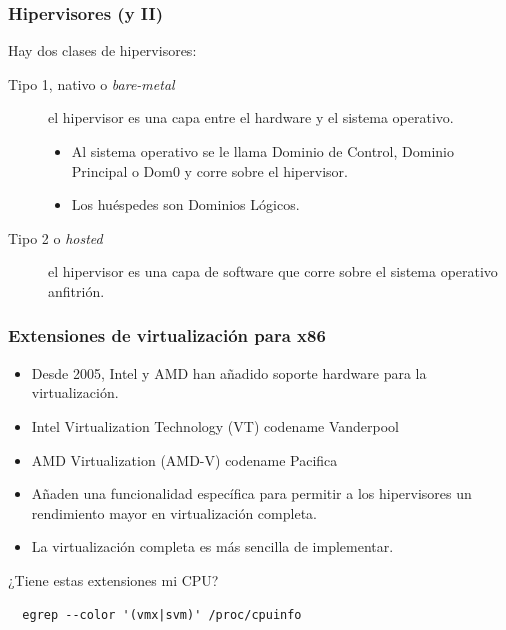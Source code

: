\documentclass{beamer}
\begin{document}
\begin{frame}
  \frametitle{Hipervisores (y II)}
  Hay dos clases de hipervisores:
  \begin{description}
  \item [Tipo 1, nativo o \emph{bare-metal}] el hipervisor es una capa
    entre el hardware y el sistema operativo.
    \begin{itemize}
    \item Al sistema operativo se le llama Dominio de Control, Dominio
      Principal o Dom0 y corre sobre el hipervisor.
    \item Los huéspedes son Dominios Lógicos.
    \end{itemize}
    \item [Tipo 2 o \emph{hosted}] el hipervisor es una capa de
      software que corre sobre el sistema operativo anfitrión.
  \end{description}
\end{frame}

\begin{frame}[fragile]
  \frametitle{Extensiones de virtualización para x86}
  \begin{itemize}
  \item Desde 2005, Intel y AMD han añadido soporte hardware para la
    virtualización.
  \item Intel Virtualization Technology (VT) codename Vanderpool
  \item AMD Virtualization (AMD-V) codename Pacifica
  \item Añaden una funcionalidad específica para permitir a los
    hipervisores un rendimiento mayor en virtualización completa.
  \item La virtualización completa es más sencilla de implementar.
  \end{itemize}
  ¿Tiene estas extensiones mi CPU?
\begin{verbatim}
  egrep --color '(vmx|svm)' /proc/cpuinfo    
\end{verbatim}
\end{frame}
\end{document}

